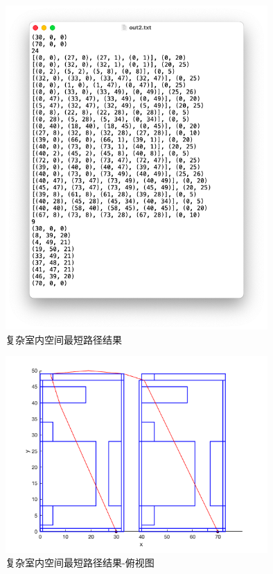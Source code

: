 \begin{figure}[!htb]
    \centering
    \includegraphics[width=10cm]{figures/test_complex_situation_out.png}
    \caption{复杂室内空间最短路径结果}
    \label{fig:test_complex_situation_out}
\end{figure}
\begin{figure}[!htb]
    \centering
    \includegraphics[width=10cm]{figures/test_complex_situation_out_top.png}
    \caption{复杂室内空间最短路径结果-俯视图}
    \label{fig:test_complex_situation_out_top}
\end{figure}
